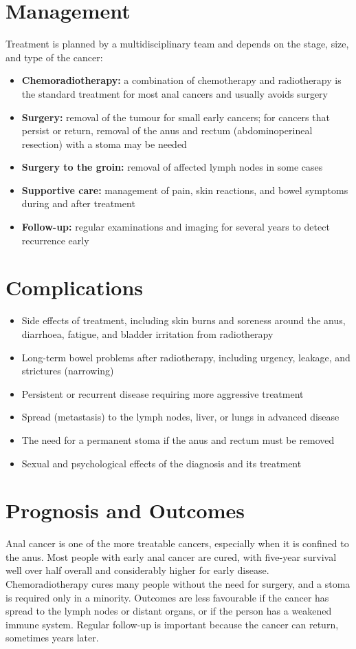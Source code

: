 \section*{Management}
Treatment is planned by a multidisciplinary team and depends on the stage, size, and type of the cancer:
\begin{itemize}
    \item \textbf{Chemoradiotherapy:} a combination of chemotherapy and radiotherapy is the standard treatment for most anal cancers and usually avoids surgery
    \item \textbf{Surgery:} removal of the tumour for small early cancers; for cancers that persist or return, removal of the anus and rectum (abdominoperineal resection) with a stoma may be needed
    \item \textbf{Surgery to the groin:} removal of affected lymph nodes in some cases
    \item \textbf{Supportive care:} management of pain, skin reactions, and bowel symptoms during and after treatment
    \item \textbf{Follow-up:} regular examinations and imaging for several years to detect recurrence early
\end{itemize}

\section*{Complications}
\begin{itemize}
    \item Side effects of treatment, including skin burns and soreness around the anus, diarrhoea, fatigue, and bladder irritation from radiotherapy
    \item Long-term bowel problems after radiotherapy, including urgency, leakage, and strictures (narrowing)
    \item Persistent or recurrent disease requiring more aggressive treatment
    \item Spread (metastasis) to the lymph nodes, liver, or lungs in advanced disease
    \item The need for a permanent stoma if the anus and rectum must be removed
    \item Sexual and psychological effects of the diagnosis and its treatment
\end{itemize}

\section*{Prognosis and Outcomes}
Anal cancer is one of the more treatable cancers, especially when it is confined to the anus. Most people with early anal cancer are cured, with five-year survival well over half overall and considerably higher for early disease. Chemoradiotherapy cures many people without the need for surgery, and a stoma is required only in a minority. Outcomes are less favourable if the cancer has spread to the lymph nodes or distant organs, or if the person has a weakened immune system. Regular follow-up is important because the cancer can return, sometimes years later.

